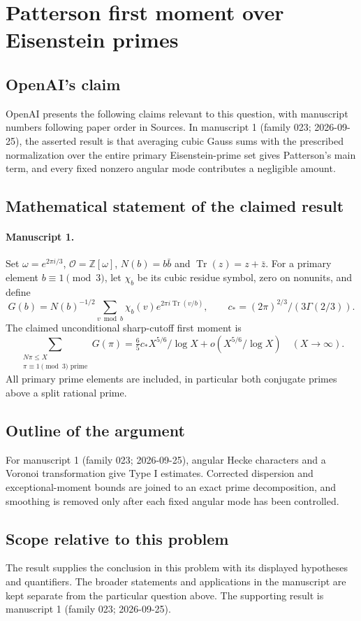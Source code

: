 \documentclass[11pt]{article}
\begin{document}
\section*{Patterson first moment over Eisenstein primes}

\subsection{OpenAI's claim}
OpenAI presents the following claims relevant to this question, with manuscript numbers following paper order in Sources. In manuscript 1 (family 023; 2026-09-25), the asserted result is that averaging cubic Gauss sums with the prescribed normalization over the entire primary Eisenstein-prime set gives Patterson's main term, and every fixed nonzero angular mode contributes a negligible amount.

\subsection{Mathematical statement of the claimed result}
\paragraph{Manuscript 1.}
Set $\omega=e^{2\pi i/3}$, $\mathcal O=\mathbb Z[\omega]$, $N(b)=b\bar b$ and $\operatorname{Tr}(z)=z+\bar z$. For a primary element $b\equiv1\pmod3$, let $\chi_b$ be its cubic residue symbol, zero on nonunits, and define
\[
 G(b)=N(b)^{-1/2}\sum_{v\bmod b}\chi_b(v)e^{2\pi i\operatorname{Tr}(v/b)},\qquad
 c_*=(2\pi)^{2/3}/(3\Gamma(2/3)).
\]
The claimed unconditional sharp-cutoff first moment is
\[
 \sum_{\substack{N\pi\le X\\\pi\equiv1\pmod3\text{ prime}}}G(\pi)
 =\tfrac65c_*X^{5/6}/\log X+o(X^{5/6}/\log X)\quad(X\to\infty).
\]
All primary prime elements are included, in particular both conjugate primes above a split rational prime.

\subsection{Outline of the argument}
For manuscript 1 (family 023; 2026-09-25), angular Hecke characters and a Voronoi transformation give Type I estimates. Corrected dispersion and exceptional-moment bounds are joined to an exact prime decomposition, and smoothing is removed only after each fixed angular mode has been controlled.

\subsection{Scope relative to this problem}
The result supplies the conclusion in this problem with its displayed hypotheses and quantifiers. The broader statements and applications in the manuscript are kept separate from the particular question above. The supporting result is manuscript 1 (family 023; 2026-09-25).
\end{document}
